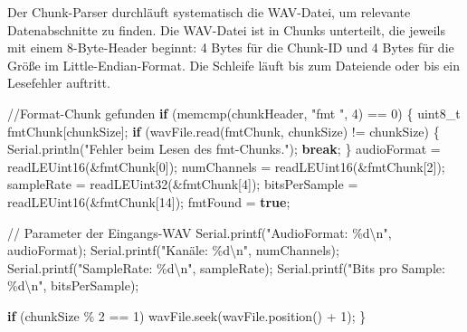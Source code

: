 \documentclass[
  ngerman,
  letterpaper,
  DIV=11]{scrreprt}
\newenvironment{Shaded}{\begin{snugshade}}{\end{snugshade}}
\newcommand{\CommentTok}[1]{\textcolor[rgb]{0.37,0.37,0.37}{#1}}
\newcommand{\ControlFlowTok}[1]{\textcolor[rgb]{0.00,0.23,0.31}{\textbf{#1}}}
\newcommand{\DataTypeTok}[1]{\textcolor[rgb]{0.68,0.00,0.00}{#1}}
\newcommand{\DecValTok}[1]{\textcolor[rgb]{0.68,0.00,0.00}{#1}}
\newcommand{\KeywordTok}[1]{\textcolor[rgb]{0.00,0.23,0.31}{\textbf{#1}}}
\newcommand{\NormalTok}[1]{\textcolor[rgb]{0.00,0.23,0.31}{#1}}
\newcommand{\OperatorTok}[1]{\textcolor[rgb]{0.37,0.37,0.37}{#1}}
\newcommand{\SpecialCharTok}[1]{\textcolor[rgb]{0.37,0.37,0.37}{#1}}
\newcommand{\StringTok}[1]{\textcolor[rgb]{0.13,0.47,0.30}{#1}}
\begin{document}
Der Chunk-Parser durchläuft systematisch die WAV-Datei, um relevante
Datenabschnitte zu finden. Die WAV-Datei ist in Chunks unterteilt, die
jeweils mit einem 8-Byte-Header beginnt: 4 Bytes für die Chunk-ID und 4
Bytes für die Größe im Little-Endian-Format. Die Schleife läuft bis zum
Dateiende oder bis ein Lesefehler auftritt.

\begin{Shaded}
\begin{Highlighting}[]
\CommentTok{//Format{-}Chunk gefunden}
\ControlFlowTok{if} \OperatorTok{(}\NormalTok{memcmp}\OperatorTok{(}\NormalTok{chunkHeader}\OperatorTok{,} \StringTok{"fmt "}\OperatorTok{,} \DecValTok{4}\OperatorTok{)} \OperatorTok{==} \DecValTok{0}\OperatorTok{)} \OperatorTok{\{}
  \DataTypeTok{uint8\_t}\NormalTok{ fmtChunk}\OperatorTok{[}\NormalTok{chunkSize}\OperatorTok{];}
  \ControlFlowTok{if} \OperatorTok{(}\NormalTok{wavFile}\OperatorTok{.}\NormalTok{read}\OperatorTok{(}\NormalTok{fmtChunk}\OperatorTok{,}\NormalTok{ chunkSize}\OperatorTok{)} \OperatorTok{!=}\NormalTok{ chunkSize}\OperatorTok{)} \OperatorTok{\{}
\NormalTok{    Serial}\OperatorTok{.}\NormalTok{println}\OperatorTok{(}\StringTok{"Fehler beim Lesen des fmt{-}Chunks."}\OperatorTok{);}
    \ControlFlowTok{break}\OperatorTok{;}
  \OperatorTok{\}}
\NormalTok{  audioFormat }\OperatorTok{=}\NormalTok{ readLEUint16}\OperatorTok{(\&}\NormalTok{fmtChunk}\OperatorTok{[}\DecValTok{0}\OperatorTok{]);}
\NormalTok{  numChannels }\OperatorTok{=}\NormalTok{ readLEUint16}\OperatorTok{(\&}\NormalTok{fmtChunk}\OperatorTok{[}\DecValTok{2}\OperatorTok{]);}
\NormalTok{  sampleRate }\OperatorTok{=}\NormalTok{ readLEUint32}\OperatorTok{(\&}\NormalTok{fmtChunk}\OperatorTok{[}\DecValTok{4}\OperatorTok{]);}
\NormalTok{  bitsPerSample }\OperatorTok{=}\NormalTok{ readLEUint16}\OperatorTok{(\&}\NormalTok{fmtChunk}\OperatorTok{[}\DecValTok{14}\OperatorTok{]);}
\NormalTok{  fmtFound }\OperatorTok{=} \KeywordTok{true}\OperatorTok{;}

  \CommentTok{// Parameter der Eingangs{-}WAV}
\NormalTok{  Serial}\OperatorTok{.}\NormalTok{printf}\OperatorTok{(}\StringTok{"AudioFormat: }\SpecialCharTok{\%d\textbackslash{}n}\StringTok{"}\OperatorTok{,}\NormalTok{ audioFormat}\OperatorTok{);}
\NormalTok{  Serial}\OperatorTok{.}\NormalTok{printf}\OperatorTok{(}\StringTok{"Kanäle: }\SpecialCharTok{\%d\textbackslash{}n}\StringTok{"}\OperatorTok{,}\NormalTok{ numChannels}\OperatorTok{);}
\NormalTok{  Serial}\OperatorTok{.}\NormalTok{printf}\OperatorTok{(}\StringTok{"SampleRate: }\SpecialCharTok{\%d\textbackslash{}n}\StringTok{"}\OperatorTok{,}\NormalTok{ sampleRate}\OperatorTok{);}
\NormalTok{  Serial}\OperatorTok{.}\NormalTok{printf}\OperatorTok{(}\StringTok{"Bits pro Sample: }\SpecialCharTok{\%d\textbackslash{}n}\StringTok{"}\OperatorTok{,}\NormalTok{ bitsPerSample}\OperatorTok{);}

  \ControlFlowTok{if} \OperatorTok{(}\NormalTok{chunkSize }\OperatorTok{\%} \DecValTok{2} \OperatorTok{==} \DecValTok{1}\OperatorTok{)}\NormalTok{ wavFile}\OperatorTok{.}\NormalTok{seek}\OperatorTok{(}\NormalTok{wavFile}\OperatorTok{.}\NormalTok{position}\OperatorTok{()} \OperatorTok{+} \DecValTok{1}\OperatorTok{);}
\OperatorTok{\}}
\end{Highlighting}
\end{Shaded}
\end{document}
